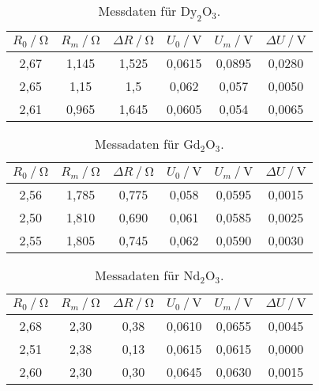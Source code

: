 \begin{table}[H]
    \centering
    \caption{Messdaten für $\text{Dy}_2 \text{O}_3$.}
    \label{tab:tab3}
    \begin{tabular}{S S S S S S}
      \toprule
        {$ R_0 \mathbin{/} \unit{\ohm} $}&{$R_m \mathbin{/} \unit{\ohm} $}&{$ \Delta R \mathbin{/} \unit{\ohm}$}&{$ U_0 \mathbin{/} \unit{\volt}$}&{$U_m \mathbin{/} \unit{\volt}$}&{$\Delta U \mathbin{/} \unit{\volt}$}\\
        \midrule
        {2,67} & {1,145}&  {1,525}&{0,0615}&{0,0895}&{0,0280}\\
        {2,65} & {1,15} &  {1,5}  &{0,062} &{0,057} &{0,0050}\\
        {2,61} & {0,965}&  {1,645}&{0,0605}&{0,054} &{0,0065}\\
      \bottomrule
    \end{tabular}
\end{table}

\begin{table}[H]
    \centering
    \caption{Messadaten für $\text{Gd}_2 \text{O}_3$.}
    \label{tab:tab4}
    \begin{tabular}{S S S S S S}
      \toprule
        {$ R_0 \mathbin{/} \unit{\ohm} $}&{$R_m \mathbin{/} \unit{\ohm} $}&{$ \Delta R \mathbin{/} \unit{\ohm}$}&{$ U_0 \mathbin{/} \unit{\volt}$}&{$U_m \mathbin{/} \unit{\volt}$}&{$\Delta U \mathbin{/} \unit{\volt}$}\\
        \midrule
        {2,56} & {1,785}&  {0,775}&{0,058}&{0,0595}&{0,0015}\\
        {2,50}  &{1,810}&  {0,690}&{0,061}&{0,0585}&{0,0025}\\
        {2,55} & {1,805}&  {0,745}&{0,062}&{0,0590}&{0,0030}\\
      \bottomrule
    \end{tabular}
\end{table}

\begin{table}[H]
    \centering
    \caption{Messadaten für $\text{Nd}_2 \text{O}_3$.}
    \label{tab:tab5}
    \begin{tabular}{S S S S S S}
      \toprule
        {$ R_0 \mathbin{/} \unit{\ohm} $}&{$R_m \mathbin{/} \unit{\ohm} $}&{$ \Delta R \mathbin{/} \unit{\ohm}$}&{$ U_0 \mathbin{/} \unit{\volt}$}&{$U_m \mathbin{/} \unit{\volt}$}&{$\Delta U \mathbin{/} \unit{\volt}$}\\
        \midrule
        {2,68} & {2,30} &  {0,38}&{0,0610}&{0,0655}&{0,0045}\\
        {2,51} & {2,38}&   {0,13}&{0,0615}&{0,0615}&{0,0000}\\
        {2,60}  &{2,30} &  {0,30}&{0,0645}&{0,0630}&{0,0015}\\
        \bottomrule
    \end{tabular}
\end{table}

